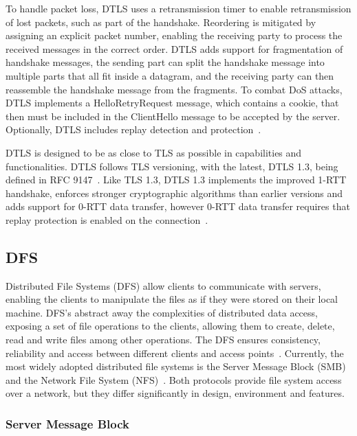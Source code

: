 \documentclass[english, 12pt, a4paper, elec, utf8, a-2b, online]{aaltothesis}
\begin{document}
To handle packet loss, DTLS uses a retransmission timer to enable retransmission of
lost packets, such as part of the handshake. Reordering is mitigated by assigning
an explicit packet number, enabling the receiving party to process the received
messages in the correct order. DTLS adds support for fragmentation of handshake messages,
the sending part can split the handshake message into multiple parts that all fit
inside a datagram, and the receiving party can then reassemble the handshake message
from the fragments. To combat DoS attacks,  DTLS implements a HelloRetryRequest message,
which contains a cookie, that then must be included in the ClientHello message
to be accepted by the server. Optionally, DTLS includes replay detection and protection~\cite{rfc9147}.

DTLS is designed to be as close to TLS as possible in capabilities and functionalities.
DTLS follows TLS versioning, with the latest, DTLS 1.3, being defined in RFC 9147~\cite{rfc9147}.
Like TLS 1.3, DTLS 1.3 implements the improved 1-RTT handshake, enforces stronger
cryptographic algorithms than earlier versions and adds support for 0-RTT data transfer,
however 0-RTT data transfer requires that replay protection is enabled on the connection~\cite{rfc9147}.

\subsection{DFS}

Distributed File Systems (DFS) allow clients to communicate with servers, enabling
the clients to manipulate the files as if they were stored on their local machine.
DFS's abstract away the complexities of distributed data access, exposing a set
of file operations to the clients, allowing them to create, delete, read and write files among other operations.
The DFS ensures consistency, reliability and access between different
clients and access points~\cite{os_concepts}. Currently, the most widely adopted
distributed file systems is the Server Message Block (SMB)~\cite{smb2} and the
Network File System (NFS)~\cite{rfc7530}. Both protocols provide file system access
over a network, but they differ significantly in design, environment and features.

\subsubsection{Server Message Block}
\end{document}
